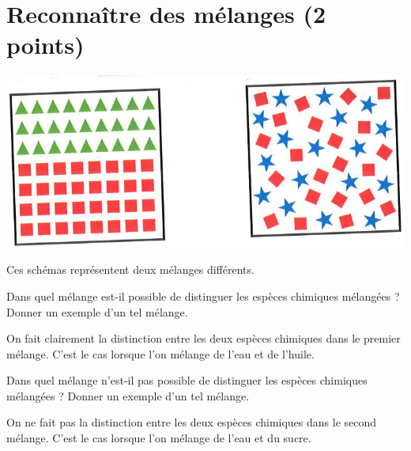 \section{Reconnaître des mélanges (2 points)}\label{ex:melanges}

\begin{center}
	\includegraphics[scale=0.4]{img/melanges}
\end{center}

Ces schémas représentent deux mélanges différents.

\begin{questions}
	\question[1] Dans quel mélange est-il possible de distinguer les espèces chimiques mélangées ? Donner un exemple d'un tel mélange.
	
	\begin{solution}
		On fait clairement la distinction entre les deux espèces chimiques dans le premier mélange. C'est le cas lorsque l'on mélange de l'eau et de l'huile.
	\end{solution}
	
	\question[1] Dans quel mélange n'est-il pas possible de distinguer les espèces chimiques mélangées ? Donner un exemple d'un tel mélange.
	\begin{solution}
		On ne fait pas la distinction entre les deux espèces chimiques dans le second mélange. C'est le cas lorsque l'on mélange de l'eau et du sucre.
	\end{solution}
\end{questions}